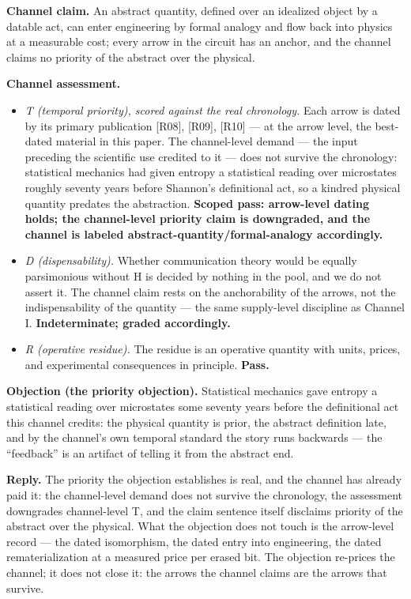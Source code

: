 \documentclass[11pt,a4paper]{article}
\begin{document}
\textbf{Channel claim.} An abstract quantity, defined over an idealized object by a datable act, can enter engineering by formal analogy and flow back into physics at a measurable cost; every arrow in the circuit has an anchor, and the channel claims no priority of the abstract over the physical.

\textbf{Channel assessment.}

\begin{itemize}[leftmargin=1.6em,itemsep=2pt,parsep=0pt,topsep=3pt]
\item \textit{T (temporal priority), scored against the real chronology.} Each arrow is dated by its primary publication [R08], [R09], [R10] — at the arrow level, the best-dated material in this paper. The channel-level demand — the input preceding the scientific use credited to it — does not survive the chronology: statistical mechanics had given entropy a statistical reading over microstates roughly seventy years before Shannon's definitional act, so a kindred physical quantity predates the abstraction. \textbf{Scoped pass: arrow-level dating holds; the channel-level priority claim is downgraded, and the channel is labeled abstract-quantity/formal-analogy accordingly.}
\item \textit{D (dispensability).} Whether communication theory would be equally parsimonious without H is decided by nothing in the pool, and we do not assert it. The channel claim rests on the anchorability of the arrows, not the indispensability of the quantity — the same supply-level discipline as Channel I. \textbf{Indeterminate; graded accordingly.}
\item \textit{R (operative residue).} The residue is an operative quantity with units, prices, and experimental consequences in principle. \textbf{Pass.}
\end{itemize}

\textbf{Objection (the priority objection).} Statistical mechanics gave entropy a statistical reading over microstates some seventy years before the definitional act this channel credits: the physical quantity is prior, the abstract definition late, and by the channel's own temporal standard the story runs backwards — the ``feedback'' is an artifact of telling it from the abstract end.

\textbf{Reply.} The priority the objection establishes is real, and the channel has already paid it: the channel-level demand does not survive the chronology, the assessment downgrades channel-level T, and the claim sentence itself disclaims priority of the abstract over the physical. What the objection does not touch is the arrow-level record — the dated isomorphism, the dated entry into engineering, the dated rematerialization at a measured price per erased bit. The objection re-prices the channel; it does not close it: the arrows the channel claims are the arrows that survive.
\end{document}
